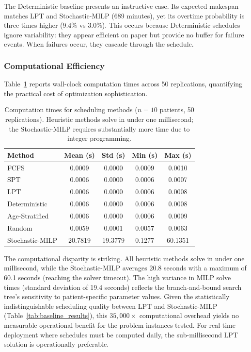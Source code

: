 \documentclass[msom,blindrev]{informs3}
\begin{document}
The Deterministic baseline presents an instructive case. Its expected makespan matches LPT and Stochastic-MILP (689 minutes), yet its overtime probability is three times higher (9.4\% vs 3.0\%). This occurs because Deterministic schedules ignore variability: they appear efficient on paper but provide no buffer for failure events. When failures occur, they cascade through the schedule.

\subsubsection{Computational Efficiency}

Table~\ref{tab:computation_times} reports wall-clock computation times across 50 replications, quantifying the practical cost of optimization sophistication.

\begin{table}[H]
\centering
\caption{Computation times for scheduling methods ($n = 10$ patients, 50 replications). Heuristic methods solve in under one millisecond; the Stochastic-MILP requires substantially more time due to integer programming.}
\label{tab:computation_times}
\begin{tabular}{lcccc}
\toprule
Method & Mean (s) & Std (s) & Min (s) & Max (s) \\
\midrule
FCFS & 0.0009 & 0.0000 & 0.0009 & 0.0010 \\
SPT & 0.0006 & 0.0000 & 0.0006 & 0.0007 \\
LPT & 0.0006 & 0.0000 & 0.0006 & 0.0008 \\
Deterministic & 0.0006 & 0.0000 & 0.0006 & 0.0008 \\
Age-Stratified & 0.0006 & 0.0000 & 0.0006 & 0.0009 \\
Random & 0.0059 & 0.0001 & 0.0057 & 0.0063 \\
Stochastic-MILP & 20.7819 & 19.3779 & 0.1277 & 60.1351 \\
\bottomrule
\end{tabular}
\end{table}

The computational disparity is striking. All heuristic methods solve in under one millisecond, while the Stochastic-MILP averages 20.8 seconds with a maximum of 60.1 seconds (reaching the solver timeout). The high variance in MILP solve times (standard deviation of 19.4 seconds) reflects the branch-and-bound search tree's sensitivity to patient-specific parameter values. Given the statistically indistinguishable scheduling quality between LPT and Stochastic-MILP (Table~\ref{tab:baseline_results}), this $35{,}000\times$ computational overhead yields no measurable operational benefit for the problem instances tested. For real-time deployment where schedules must be computed daily, the sub-millisecond LPT solution is operationally preferable.
\end{document}
